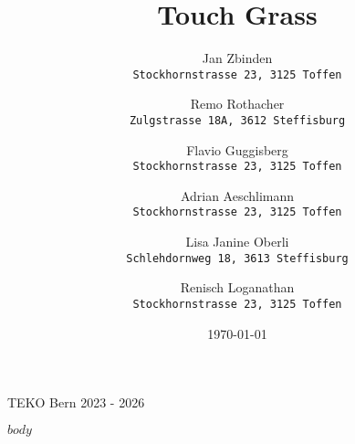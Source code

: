 \documentclass{article}
\title{Touch Grass}
\author{
  Jan Zbinden\\
  \texttt{Stockhornstrasse 23, 3125 Toffen}
  \and
  Remo Rothacher\\
  \texttt{Zulgstrasse 18A, 3612 Steffisburg}
  \and
  Flavio Guggisberg\\
  \texttt{Stockhornstrasse 23, 3125 Toffen}
  \and
  Adrian Aeschlimann\\
  \texttt{Stockhornstrasse 23, 3125 Toffen}
  \and
  Lisa Janine Oberli\\
  \texttt{Schlehdornweg 18, 3613 Steffisburg}
  \and
  Renisch Loganathan\\
  \texttt{Stockhornstrasse 23, 3125 Toffen}
}
\date{\today}
\begin{document}
\begin{titlingpage}
    \maketitle
    \begin{center}
        TEKO Bern 2023 - 2026
    \end{center}
\end{titlingpage}

\tableofcontents
\newpage

$body$
\end{document}

